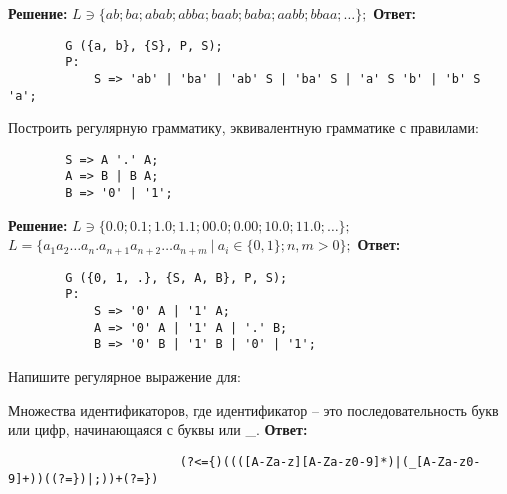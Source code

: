 \documentclass[]{article}
\begin{document}
\begin{enumerate}
\begin{item}
    \textbf{Решение:}
    \smallbreak
    $L \ni \{ ab; ba; abab; abba; baab; baba; aabb; bbaa; \dots \};$
    \bigbreak
    \textbf{Ответ:}
    \begin{lstlisting}
        G ({a, b}, {S}, P, S);
        P:
            S => 'ab' | 'ba' | 'ab' S | 'ba' S | 'a' S 'b' | 'b' S 'a';
    \end{lstlisting}
\end{item}

\begin{item}
    Построить регулярную грамматику, эквивалентную грамматике с правилами:
    \begin{lstlisting}
        S => A '.' A;
        A => B | B A;
        B => '0' | '1';
    \end{lstlisting}

    \textbf{Решение:}
    \smallbreak
    $L \ni \{ 0.0; 0.1; 1.0; 1.1; 00.0; 0.00; 10.0; 11.0; \dots \};$
    \hfill\break$L = \{ a_1 a_2 \dots a_n . a_{n+1} a_{n+2} \dots a_{n+m} \ |\  a_i \in \{ 0, 1 \}; n, m > 0 \};$
    \bigbreak
    \textbf{Ответ:}
    \begin{lstlisting}
        G ({0, 1, .}, {S, A, B}, P, S);
        P:
            S => '0' A | '1' A;
            A => '0' A | '1' A | '.' B;
            B => '0' B | '1' B | '0' | '1';
    \end{lstlisting}
\end{item}

\begin{item}
    Напишите регулярное выражение для:
    \begin{enumerate}

        \begin{item}
            Множества идентификаторов, где идентификатор – это последовательность букв или цифр, начинающаяся с буквы или \_.
            \bigbreak
            \textbf{Ответ:}
            \begin{enumerate}

                \begin{item}
                    \begin{lstlisting}
                        (?<={)((([A-Za-z][A-Za-z0-9]*)|(_[A-Za-z0-9]+))((?=})|;))+(?=})
                    \end{lstlisting}
                \end{item}


\end{enumerate}
\end{item}
\end{enumerate}
\end{item}
\end{enumerate}
\end{document}
